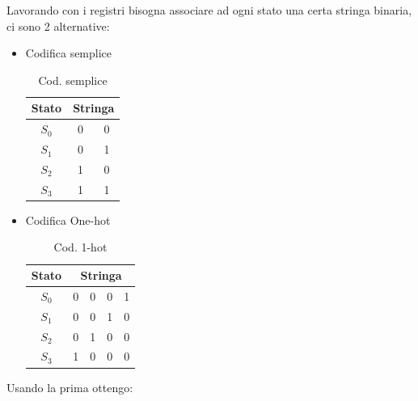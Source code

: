 \documentclass{article}
\begin{document}
Lavorando con i registri bisogna associare ad ogni stato una certa stringa binaria, ci sono 2 alternative:

\vspace{2pt}

\begin{itemize}
    \item Codifica semplice

    \begin{table}[ht]
        \centering
        \begin{tabular}{c|cc}
            Stato & \multicolumn{2}{c}{Stringa} \\
             \hline
             $S_0$ & 0 & 0\\
             $S_1$ & 0 & 1\\
             $S_2$ & 1 & 0\\
             $S_3$ & 1 & 1
        \end{tabular}
        \caption{Cod. semplice}
        \label{tab:cod1}
    \end{table}
    
    \item Codifica One-hot

    \begin{table}[ht]
        \centering
        \begin{tabular}{c|cccc}
            Stato & \multicolumn{4}{c}{Stringa} \\
             \hline
             $S_0$ & 0 & 0 & 0 & 1\\
             $S_1$ & 0 & 0 & 1 & 0\\
             $S_2$ & 0 & 1 & 0 & 0\\
             $S_3$ & 1 & 0 & 0 & 0
        \end{tabular}
        \caption{Cod. 1-hot}
        \label{tab:cod2}
    \end{table}
    
\end{itemize}

\newpage

Usando la prima ottengo:
\end{document}
